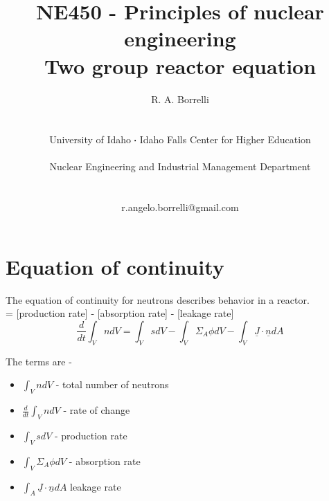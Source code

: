 \documentclass[11pt,a4paper]{article}
\newcommand*\sq{\mathbin{\vcenter{\hbox{\rule{.3ex}{.3ex}}}}} %
\begin{document}
\begin{titlepage}
    \title{
        NE450 - Principles of nuclear engineering\\
        Two group reactor equation\\
    }
    \author{
        R. A. Borrelli
        \\ \\ \\
        University of Idaho $\sq$ Idaho Falls Center for Higher Education
        \\ \\
        Nuclear Engineering and Industrial Management Department
        \\ \\ \\
        r.angelo.borrelli@gmail.com
    }
\clearpage %
\maketitle
\thispagestyle{empty} %
\end{titlepage}

\section{Equation of continuity}
\noindent The equation of continuity for neutrons describes behavior in a reactor.\\

 = [production rate] - [absorption rate] - [leakage rate]\\

\begin{equation} \label{eq-1-continuity}
    \frac{d}{dt}\int_V ndV=\int_V sdV-\int_V\Sigma_A\phi dV-\int_V\underline{J}\cdot\underline{n}dA
\end{equation}

\noindent The terms are - 
\begin{itemize}[leftmargin=*,topsep=0pt]
    \item $\int_V ndV$ - total number of neutrons
    \item $\frac{d}{dt} \int_V ndV$ - rate of change
    \item $\int_V sdV$ - production rate
    \item $\int_V \Sigma_A \phi dV$ - absorption rate
    \item $\int_A \underline{J} \cdot \underline{n} dA$ leakage rate
\end{itemize}
\vspace{\baselineskip}
\end{document}
